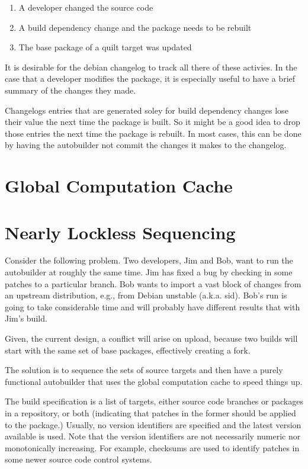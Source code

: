 \documentclass[12pt]{article}
\begin{document}
\begin{enumerate}
\item A developer changed the source code
\item A build dependency change and the package needs to be rebuilt
\item The base package of a quilt target was updated
\end{enumerate}

It is desirable for the debian changelog to track all there of these
activies. In the case that a developer modifies the package, it is
especially useful to have a brief summary of the changes they made.

Changelogs entries that are generated soley for build dependency
changes lose their value the next time the package is built. So it
might be a good idea to drop those entries the next time the package
is rebuilt. In most cases, this can be done by having the autobuilder
not commit the changes it makes to the changelog.





\section{Global Computation Cache}

\section{Nearly Lockless Sequencing}

Consider the following problem.  Two developers, Jim and Bob, want to run the
autobuilder at roughly the same time.  Jim has fixed a bug by
checking in some patches to a particular branch.  Bob wants to import
a vast block of changes from an upstream distribution, e.g., from
Debian unstable (a.k.a. sid).  Bob's run is going to take considerable
time and will probably have different results that with Jim's build.

Given, the current design, a conflict will arise on upload, because
two builds will start with the same set of base packages, effectively
creating a fork.

The solution is to sequence the sets of source targets and then have a
purely functional autobuilder that uses the global computation cache
to speed things up.

The build specification is a list of targets, either source code
branches or packages in a repository, or both (indicating that patches
in the former should be applied to the package.)  Usually, no version
identifiers are specified and the latest version available is used.
Note that the version identifiers are not necessarily numeric nor
monotonically increasing.  For example, checksums are used to identify
patches in some newer source code control systems.
\end{document}
